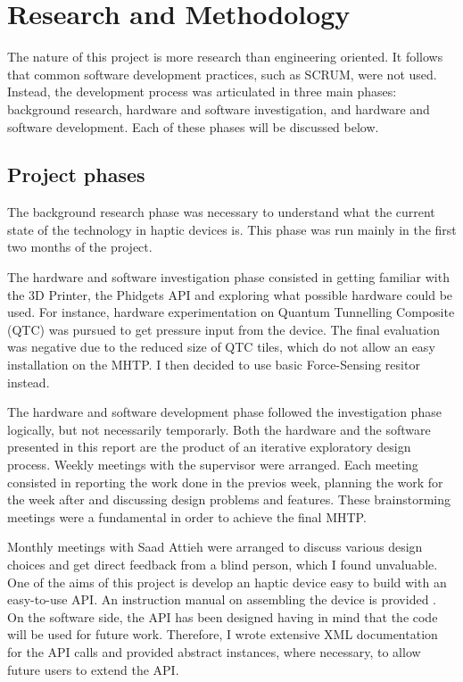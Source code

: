 \chapter{Research and Methodology}

The nature of this project is more research than engineering oriented. It follows that common software development practices, such as SCRUM, were not used. Instead, the development process was articulated in three main phases: background research, hardware and software investigation, and hardware and software development. Each of these phases will be discussed below. 

\section{Project phases}
The background research phase was necessary to understand what the current state of the technology in haptic devices is. This phase was run mainly in the first two months of the project. 

The hardware and software investigation phase consisted in getting familiar with the 3D Printer, the Phidgets API and exploring what possible hardware could be used. For instance, hardware experimentation on Quantum Tunnelling Composite (QTC) was pursued to get pressure input from the device. The final evaluation was negative due to the reduced size of QTC tiles, which do not allow an easy installation on the MHTP. I then decided to use basic Force-Sensing resitor instead. 

The hardware and software development phase followed the investigation phase logically, but not necessarily temporarly. Both the hardware and the software presented in this report are the product of an iterative exploratory design process. Weekly meetings with the supervisor were arranged. Each meeting consisted in reporting the work done in the previos week, planning the work for the week after and discussing design problems and features. These brainstorming meetings were a fundamental in order to achieve the final MHTP.

Monthly meetings with Saad Attieh were arranged to discuss various design choices and get direct feedback from a blind person, which I found unvaluable. 
One of the aims of this project is develop an haptic device easy to build with an easy-to-use API. An instruction manual on assembling the device is provided . On the software side, the API has been designed having in mind that the code will be used for future work. Therefore, I wrote extensive XML documentation for the API calls and provided abstract instances, where necessary, to allow future users to extend the API. 

